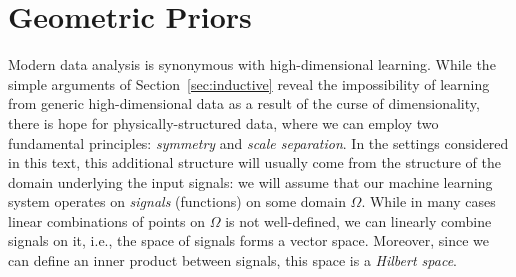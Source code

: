 \newpage
\section{Geometric Priors}
\label{sec:geom_priors}
Modern data analysis is synonymous with high-dimensional learning.  
While the simple arguments of Section~\ref{sec:inductive} reveal the impossibility of learning 
from generic high-dimensional data as a result of the curse of dimensionality, 
there is hope for physically-structured data, where we can employ two fundamental principles: {\em symmetry} and {\em scale separation}. 
In the settings considered in this text, this additional structure will usually come from the structure of the domain underlying the input signals: 
we will assume that our machine learning system operates on \emph{signals} (functions) on some domain $\Omega$. 
%
While in many cases linear combinations of points on $\Omega$ is not well-defined, we can linearly combine signals on it, i.e., the space of signals forms a vector space. 
Moreover, since we can define an inner product between signals, this space is a {\em Hilbert space}.

